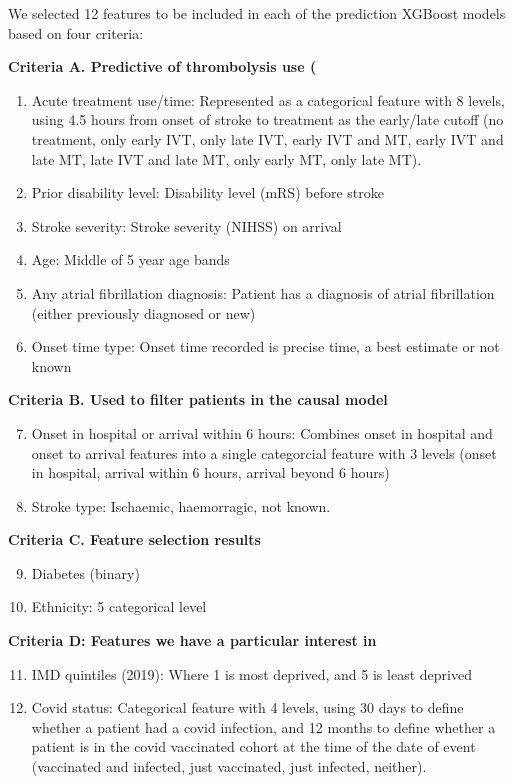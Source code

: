 We selected 12 features to be included in each of the prediction XGBoost models based on four criteria:

\textbf{Criteria A. Predictive of thrombolysis use (\cite{pearn_thrombolysis_2026}}

\begin{enumerate}
  \setcounter{enumi}{0}
    \item Acute treatment use/time: Represented as a categorical feature with 8 levels, using 4.5 hours from onset of stroke to treatment as the early/late cutoff (no treatment, only early IVT, only late IVT, early IVT and MT, early IVT and late MT, late IVT and late MT, only early MT, only late MT).
    \item Prior disability level: Disability level (mRS) before stroke
    \item Stroke severity: Stroke severity (NIHSS) on arrival
    \item Age: Middle of 5 year age bands
    \item Any atrial fibrillation diagnosis: Patient has a diagnosis of atrial fibrillation (either previously diagnosed or new)
    \item Onset time type: Onset time recorded is precise time, a best estimate or not known   
\end{enumerate}

\textbf{Criteria B. Used to filter patients in the causal model}

\begin{enumerate}
  \setcounter{enumi}{6}
    \item Onset in hospital or arrival within 6 hours: Combines onset in hospital and onset to arrival features into a single categorcial feature with 3 levels (onset in hospital, arrival within 6 hours, arrival beyond 6 hours)
    \item Stroke type: Ischaemic, haemorragic, not known.
\end{enumerate}

\textbf{Criteria C. Feature selection results}
\begin{enumerate}
  \setcounter{enumi}{8}
    \item Diabetes (binary)
    \item Ethnicity: 5 categorical level
\end{enumerate}

\textbf{Criteria D: Features we have a particular interest in}

\begin{enumerate}
  \setcounter{enumi}{10}
    \item IMD quintiles (2019): Where 1 is most deprived, and 5 is least deprived
    \item Covid status: Categorical feature with 4 levels, using 30 days to define whether a patient had a covid infection, and 12 months to define whether a patient is in the covid vaccinated cohort  at the time of the date of event (vaccinated and infected, just vaccinated, just infected, neither).    
\end{enumerate}


